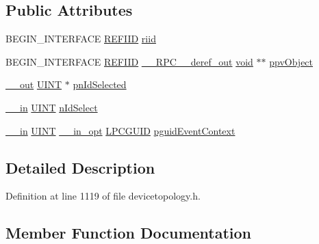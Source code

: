 \subsection*{Public Attributes}
\begin{DoxyCompactItemize}
\item 
B\+E\+G\+I\+N\+\_\+\+I\+N\+T\+E\+R\+F\+A\+CE \hyperlink{px__win__ds_8c_a80ec49c8ae61e234197d5071d2df497d}{R\+E\+F\+I\+ID} \hyperlink{struct_i_audio_input_selector_vtbl_a7964de7bac4d0e60f60f31368cef5596}{riid}
\item 
B\+E\+G\+I\+N\+\_\+\+I\+N\+T\+E\+R\+F\+A\+CE \hyperlink{px__win__ds_8c_a80ec49c8ae61e234197d5071d2df497d}{R\+E\+F\+I\+ID} \hyperlink{rpcsal_8h_a23bc188526f10656f9c79d950f6c3192}{\+\_\+\+\_\+\+R\+P\+C\+\_\+\+\_\+deref\+\_\+out} \hyperlink{sound_8c_ae35f5844602719cf66324f4de2a658b3}{void} $\ast$$\ast$ \hyperlink{struct_i_audio_input_selector_vtbl_a52884398441e59b740c6610306e8e1bf}{ppv\+Object}
\item 
\hyperlink{sal_8h_abb4c3c1135aab6c47cff22e7c16efb74}{\+\_\+\+\_\+out} \hyperlink{mapinls_8h_a36cb3b01d81ffd844bbbfb54003e06ec}{U\+I\+NT} $\ast$ \hyperlink{struct_i_audio_input_selector_vtbl_ad6ff9afe59f18b7edbf695beeada2566}{pn\+Id\+Selected}
\item 
\hyperlink{sal_8h_a3f6b8655e1aa9dfc15a9029f0343009e}{\+\_\+\+\_\+in} \hyperlink{mapinls_8h_a36cb3b01d81ffd844bbbfb54003e06ec}{U\+I\+NT} \hyperlink{struct_i_audio_input_selector_vtbl_ae01282b0cf8636a5979f9fe06c8ec8b8}{n\+Id\+Select}
\item 
\hyperlink{sal_8h_a3f6b8655e1aa9dfc15a9029f0343009e}{\+\_\+\+\_\+in} \hyperlink{mapinls_8h_a36cb3b01d81ffd844bbbfb54003e06ec}{U\+I\+NT} \hyperlink{sal_8h_a9c2d0f2980e51b51bb405ee2a31a3353}{\+\_\+\+\_\+in\+\_\+opt} \hyperlink{pa__win__wasapi_8c_a9c061ab1f26db8746b3dab38991f48a0}{L\+P\+C\+G\+U\+ID} \hyperlink{struct_i_audio_input_selector_vtbl_a35b1ebc40389a4bafa8acb27e9d6a984}{pguid\+Event\+Context}
\end{DoxyCompactItemize}


\subsection{Detailed Description}


Definition at line 1119 of file devicetopology.\+h.



\subsection{Member Function Documentation}
